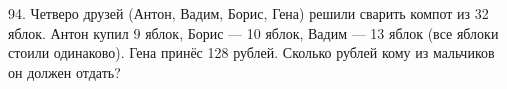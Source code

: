 94. Четверо друзей (Антон, Вадим, Борис, Гена) решили сварить компот из 32 яблок. Антон купил 9 яблок, Борис --- 10 яблок, Вадим --- 13 яблок (все яблоки стоили одинаково). Гена принёс 128 рублей. Сколько рублей кому из мальчиков он должен отдать?\\
